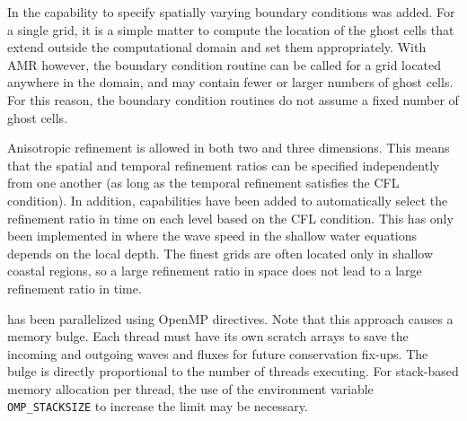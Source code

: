 In  the capability to specify spatially varying boundary
conditions was added. For a single grid, it is a simple matter to
compute the location of the ghost cells that extend outside the
computational domain and set them appropriately.  With AMR however,
the boundary condition routine can be called for a grid located
anywhere in the domain, and may contain fewer or larger numbers of
ghost cells. For this reason, the boundary condition routines
 do not assume a fixed number of ghost cells.

Anisotropic refinement is allowed in both two and three dimensions.
This means that the spatial and temporal refinement ratios can be
specified independently from one another (as long as the temporal
refinement satisfies the CFL condition).  In addition, capabilities
have been added to automatically select the refinement ratio in time  on each
level based on the CFL condition.  This has only been implemented in
\geoclaw where the wave speed in the shallow water equations
depends on the local depth. The finest grids are often located only in
shallow coastal regions, so a large refinement ratio in space does not
lead to a large refinement ratio in time.

\amrclaw has been parallelized using OpenMP directives.   Note that this approach causes a
memory bulge. Each thread must have its own scratch arrays to save the incoming
and outgoing waves and fluxes for future conservation fix-ups. The bulge is
directly proportional to the number of threads executing. For stack-based memory
allocation per thread, the use of the environment variable {\tt OMP\_STACKSIZE}
to increase the limit may be necessary.

